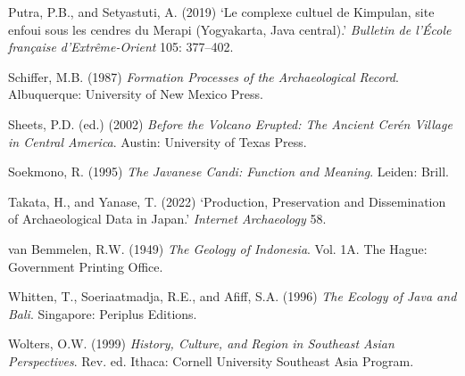 \documentclass[12pt,a4paper]{article}
\begin{document}
\vspace{0.5em}
\noindent Putra, P.B., and Setyastuti, A. (2019) `Le complexe cultuel de Kimpulan, site enfoui sous les cendres du Merapi (Yogyakarta, Java central).' \emph{Bulletin de l'\'{E}cole fran\c{c}aise d'Extr\^{e}me-Orient} 105: 377--402.

\vspace{0.5em}
\noindent Schiffer, M.B. (1987) \emph{Formation Processes of the Archaeological Record}. Albuquerque: University of New Mexico Press.

\vspace{0.5em}
\noindent Sheets, P.D. (ed.) (2002) \emph{Before the Volcano Erupted: The Ancient Cer\'{e}n Village in Central America}. Austin: University of Texas Press.

\vspace{0.5em}
\noindent Soekmono, R. (1995) \emph{The Javanese Candi: Function and Meaning}. Leiden: Brill.

\vspace{0.5em}
\noindent Takata, H., and Yanase, T. (2022) `Production, Preservation and Dissemination of Archaeological Data in Japan.' \emph{Internet Archaeology} 58.

\vspace{0.5em}
\noindent van Bemmelen, R.W. (1949) \emph{The Geology of Indonesia}. Vol. 1A. The Hague: Government Printing Office.

\vspace{0.5em}
\noindent Whitten, T., Soeriaatmadja, R.E., and Afiff, S.A. (1996) \emph{The Ecology of Java and Bali}. Singapore: Periplus Editions.

\vspace{0.5em}
\noindent Wolters, O.W. (1999) \emph{History, Culture, and Region in Southeast Asian Perspectives}. Rev. ed. Ithaca: Cornell University Southeast Asia Program.
\end{document}

